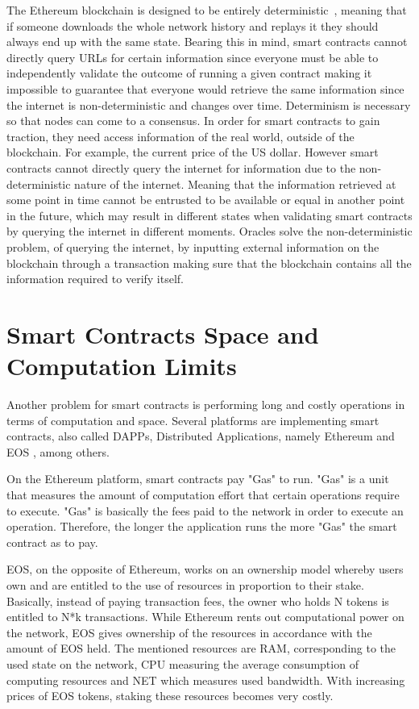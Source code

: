 The Ethereum blockchain is designed to be entirely deterministic~\citet{GavinWood2014}, meaning that if someone downloads the whole network history and replays it they should always end up with the same state. Bearing this in mind, smart contracts cannot directly query URLs for certain information since everyone must be able to independently validate the outcome of running a given contract making it impossible to guarantee that everyone would retrieve the same information since the internet is non-deterministic and changes over time. Determinism is necessary so that nodes can come to a consensus. In order for smart contracts to gain traction, they need access information of the real world, outside of the blockchain. For example, the current price of the US dollar. However smart contracts cannot directly query the internet for information due to the non-deterministic nature of the internet. Meaning that the information retrieved at some point in time cannot be entrusted to be available or equal in another point in the future, which may result in different states when validating smart contracts by querying the internet in different moments. Oracles solve the non-deterministic problem, of querying the internet, by inputting external information on the blockchain through a transaction making sure that the blockchain contains all the information required to verify itself.


\section{Smart Contracts Space and Computation Limits}

Another problem for smart contracts is performing long and costly operations in terms of computation and space. Several platforms are implementing smart contracts, also called DAPPs, Distributed Applications, namely Ethereum and EOS \citet{Block.one2018}, among others.

On the Ethereum platform, smart contracts pay "Gas" to run. "Gas" is a unit that measures the amount of computation effort that certain operations require to execute. "Gas" is basically the fees paid to the network in order to execute an operation. Therefore, the longer the application runs the more "Gas" the smart contract as to pay.

EOS, on the opposite of Ethereum, works on an ownership model whereby users own and are entitled to the use of resources in proportion to their stake. Basically, instead of paying transaction fees, the owner who holds N tokens is entitled to N*k transactions. While Ethereum rents out computational power on the network, EOS gives ownership of the resources in accordance with the amount of EOS held. The mentioned resources are RAM, corresponding to the used state on the network, CPU measuring the average consumption of computing resources and NET which measures used bandwidth. With increasing prices of EOS tokens, staking these resources becomes very costly.

